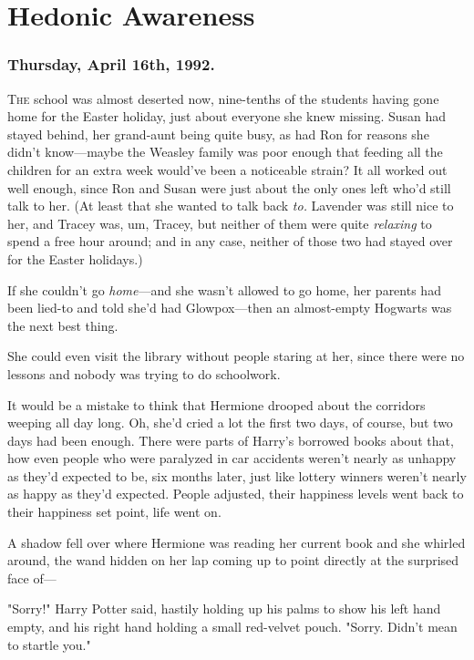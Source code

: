 \chapter{Hedonic Awareness}

\subsection{Thursday, April 16th, 1992.}

\lettrine{T}{he} school was almost deserted now, nine-tenths of the students having gone
home for the Easter holiday, just about everyone she knew missing. Susan had
stayed behind, her grand-aunt being quite busy, as had Ron for reasons she
didn't know---maybe the Weasley family was poor enough that feeding all the
children for an extra week would've been a noticeable strain? It all worked out
well enough, since Ron and Susan were just about the only ones left who'd still
talk to her. (At least that she wanted to talk back \emph{to.} Lavender was
still nice to her, and Tracey was, um, Tracey, but neither of them were quite
\emph{relaxing} to spend a free hour around; and in any case, neither of those
two had stayed over for the Easter holidays.)

If she couldn't go \emph{home}---and she wasn't allowed to go home, her parents
had been lied-to and told she'd had Glowpox---then an almost-empty Hogwarts was
the next best thing.

She could even visit the library without people staring at her, since there
were no lessons and nobody was trying to do schoolwork.

It would be a mistake to think that Hermione drooped about the corridors
weeping all day long. Oh, she'd cried a lot the first two days, of course, but
two days had been enough. There were parts of Harry's borrowed books about
that, how even people who were paralyzed in car accidents weren't nearly as
unhappy as they'd expected to be, six months later, just like lottery winners
weren't nearly as happy as they'd expected. People adjusted, their happiness
levels went back to their happiness set point, life went on.

A shadow fell over where Hermione was reading her current book and she whirled
around, the wand hidden on her lap coming up to point directly at the surprised
face of---

"Sorry!" Harry Potter said, hastily holding up his palms to show his left hand
empty, and his right hand holding a small red-velvet pouch. "Sorry. Didn't mean
to startle you."

